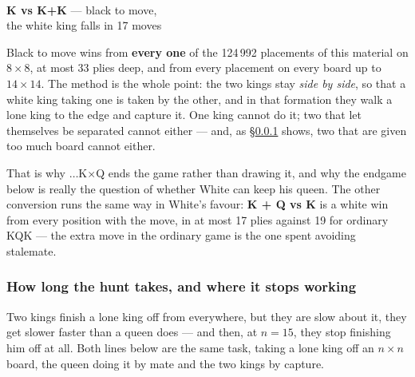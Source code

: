 \documentclass[11pt]{article}
\begin{document}
\begin{center}
\begin{minipage}{0.36\textwidth}\centering
  \\[1.5mm]
  {\small\color{kqkk}\textbf{K vs K+K} --- black to move,\\the white king falls in 17 moves}
\end{minipage}\hspace{0.04\textwidth}
\begin{minipage}{0.56\textwidth}
\small
Black to move wins from \textbf{every one} of the 124\,992 placements of this
material on $8\times8$, at most 33 plies deep, and from every placement on
every board up to $14\times14$. The method is the whole point: the two kings
stay \emph{side by side}, so that a white king taking one is taken by the
other, and in that formation they walk a lone king to the edge and capture it.
One king cannot do it; two that let themselves be separated cannot either ---
and, as \S\ref{sub:cap-hunt-length} shows, two that are given too much board cannot either.

\smallskip
That is why $\ldots$K$\times$Q ends the game rather than drawing it, and why
the endgame below is really the question of whether White can keep his queen.
The other conversion runs the same way in White's favour: \textbf{K + Q vs K} is
a white win from every position with the move, in at most 17 plies against 19
for ordinary KQK --- the extra move in the ordinary game is the one spent
avoiding stalemate.
\end{minipage}
\end{center}

\subsubsection{How long the hunt takes, and where it stops working}\label{sub:cap-hunt-length}

Two kings finish a lone king off from everywhere, but they are slow about it,
they get slower faster than a queen does --- and then, at $n=15$, they stop
finishing him off at all. Both lines below are the same task, taking a lone
king off an $n \times n$ board, the queen doing it by mate and the two kings by
capture.
\end{document}
